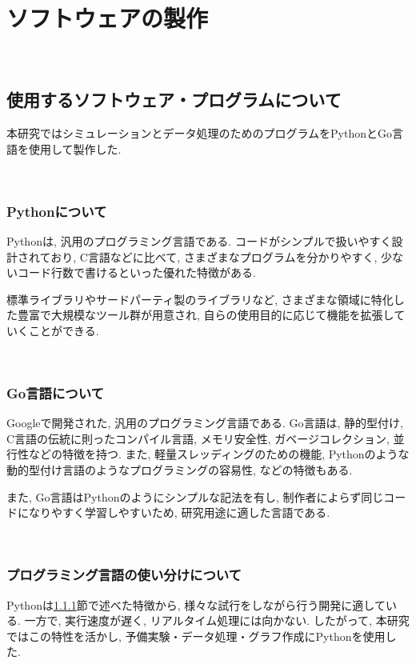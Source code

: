 \chapter{ソフトウェアの製作}\label{software}

\
\section{使用するソフトウェア・プログラムについて}\label{about-program}

本研究ではシミュレーションとデータ処理のためのプログラムをPythonとGo言語を使用して製作した. 

\
\subsection{Pythonについて}\label{about-python}

Pythonは, 汎用のプログラミング言語である. コードがシンプルで扱いやすく設計されており, C言語などに比べて, さまざまなプログラムを分かりやすく, 少ないコード行数で書けるといった優れた特徴がある. 

標準ライブラリやサードパーティ製のライブラリなど, さまざまな領域に特化した豊富で大規模なツール群が用意され, 自らの使用目的に応じて機能を拡張していくことができる. 


\
\subsection{Go言語について}\label{about-go}

Googleで開発された, 汎用のプログラミング言語である. Go言語は, 静的型付け, C言語の伝統に則ったコンパイル言語, メモリ安全性, ガベージコレクション, 並行性などの特徴を持つ. また, 軽量スレッディングのための機能, Pythonのような動的型付け言語のようなプログラミングの容易性, などの特徴もある. 

また, Go言語はPythonのようにシンプルな記法を有し, 制作者によらず同じコードになりやすく学習しやすいため, 研究用途に適した言語である. 

\
\subsection{プログラミング言語の使い分けについて}\label{about-proper-use}

Pythonは\ref{about-python}節で述べた特徴から, 様々な試行をしながら行う開発に適している. 一方で, 実行速度が遅く, リアルタイム処理には向かない. したがって, 本研究ではこの特性を活かし, 予備実験・データ処理・グラフ作成にPythonを使用した. 


